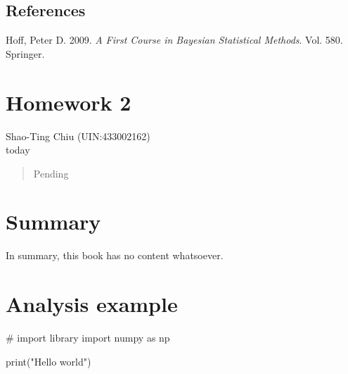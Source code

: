\documentclass[
  letterpaper,
  DIV=11,
  numbers=noendperiod]{scrreprt}
\newenvironment{Shaded}{\begin{snugshade}}{\end{snugshade}}
\newcommand{\BuiltInTok}[1]{\textcolor[rgb]{0.00,0.23,0.31}{#1}}
\newcommand{\CommentTok}[1]{\textcolor[rgb]{0.37,0.37,0.37}{#1}}
\newcommand{\ImportTok}[1]{\textcolor[rgb]{0.00,0.46,0.62}{#1}}
\newcommand{\NormalTok}[1]{\textcolor[rgb]{0.00,0.23,0.31}{#1}}
\newcommand{\StringTok}[1]{\textcolor[rgb]{0.13,0.47,0.30}{#1}}
\newlength{\cslhangindent}
\newlength{\cslentryspacingunit} %
\newenvironment{CSLReferences}[2] %
 {%
  \setlength{\parindent}{0pt}
  \ifodd #1
  \let\oldpar\par
  \def\par{\hangindent=\cslhangindent\oldpar}
  \fi
  \setlength{\parskip}{#2\cslentryspacingunit}
 }%
 {}
\begin{document}
\hypertarget{references}{%
\section*{References}\label{references}}

\hypertarget{refs}{}
\begin{CSLReferences}{1}{0}
\leavevmode{}%
Hoff, Peter D. 2009. \emph{A First Course in Bayesian Statistical
Methods}. Vol. 580. Springer.

\end{CSLReferences}


\hypertarget{homework-2}{%
\chapter{Homework 2}\label{homework-2}}

Shao-Ting Chiu (UIN:433002162)\\
today

\hfill\break

\begin{quote}
Pending
\end{quote}


\hypertarget{summary}{%
\chapter{Summary}\label{summary}}

In summary, this book has no content whatsoever.


\hypertarget{analysis-example}{%
\chapter{Analysis example}\label{analysis-example}}

\begin{Shaded}
\begin{Highlighting}[]
\CommentTok{\# import library}
\ImportTok{import}\NormalTok{ numpy }\ImportTok{as}\NormalTok{ np}
\end{Highlighting}
\end{Shaded}

\begin{Shaded}
\begin{Highlighting}[]
\BuiltInTok{print}\NormalTok{(}\StringTok{"Hello world"}\NormalTok{)}
\end{Highlighting}
\end{Shaded}
\end{document}
